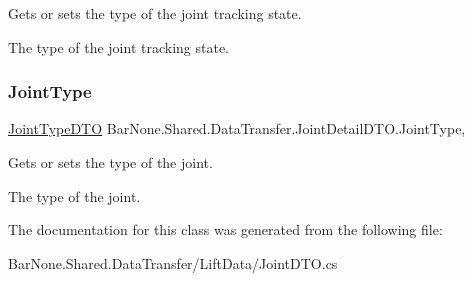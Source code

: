 Gets or sets the type of the joint tracking state. 

The type of the joint tracking state. \mbox{\label{class_bar_none_1_1_shared_1_1_data_transfer_1_1_joint_detail_d_t_o_a8ce78e4e245cfc63a5d9d2c024896130}} 
\subsubsection{\texorpdfstring{Joint\+Type}{JointType}}
{\footnotesize\ttfamily \mbox{\hyperlink{class_bar_none_1_1_shared_1_1_data_transfer_1_1_lift_data_1_1_joint_type_d_t_o}{Joint\+Type\+D\+TO}} Bar\+None.\+Shared.\+Data\+Transfer.\+Joint\+Detail\+D\+T\+O.\+Joint\+Type\hspace{0.3cm}{\ttfamily [get]}, {\ttfamily [set]}}



Gets or sets the type of the joint. 

The type of the joint. 

The documentation for this class was generated from the following file\+:\begin{DoxyCompactItemize}
\item 
Bar\+None.\+Shared.\+Data\+Transfer/\+Lift\+Data/Joint\+D\+T\+O.\+cs\end{DoxyCompactItemize}
